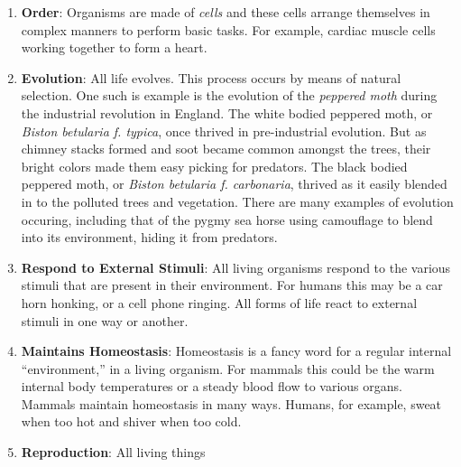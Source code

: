 \documentclass[crop=false,class=book,oneside]{standalone}
\begin{document}
        \begin{enumerate}
            \item \textbf{Order}: Organisms are made of
                  \textit{cells} and these cells arrange
                  themselves in complex manners to perform
                  basic tasks. For example, cardiac muscle
                  cells working together to form a heart.
            \item \textbf{Evolution}: All life evolves.
                  This process occurs by means of natural
                  selection. One such is example is the
                  evolution of the \textit{peppered moth}
                  during the industrial revolution in
                  England. The white bodied peppered moth,
                  or \textit{Biston betularia f. typica},
                  once thrived in pre-industrial evolution.
                  But as chimney stacks formed and soot
                  became common amongst the trees, their
                  bright colors made them easy picking
                  for predators. The black bodied
                  peppered moth, or
                  \textit{Biston betularia f. carbonaria},
                  thrived as it easily blended in to the
                  polluted trees and vegetation. There are
                  many examples of evolution occuring,
                  including that of the
                  pygmy sea horse using camouflage to
                  blend into its environment, hiding it
                  from predators.
            \item \textbf{Respond to External Stimuli}:
                  All living organisms respond
                  to the various stimuli
                  that are present in their environment.
                  For humans this may be a car horn
                  honking, or a cell phone ringing.
                  All forms of life
                  react to external stimuli in one way or
                  another.
            \item \textbf{Maintains Homeostasis}:
                  Homeostasis is a fancy word for a
                  regular internal ``environment,'' in
                  a living organism. For mammals this could
                  be the warm internal body temperatures
                  or a steady blood flow to various organs.
                  Mammals maintain homeostasis in
                  many ways.
                  Humans, for example, sweat when too hot
                  and shiver when too cold.
            \item \textbf{Reproduction}: All living things

\end{enumerate}
\end{document}
